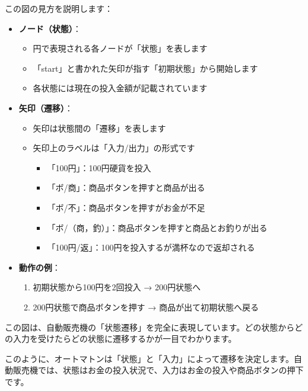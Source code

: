 この図の見方を説明します：

\begin{itemize}
\tightlist
\item
  \textbf{ノード（状態）}：

  \begin{itemize}
  \tightlist
  \item
    円で表現される各ノードが「状態」を表します
  \item
    「start」と書かれた矢印が指す「初期状態」から開始します
  \item
    各状態には現在の投入金額が記載されています
  \end{itemize}
\item
  \textbf{矢印（遷移）}：

  \begin{itemize}
  \tightlist
  \item
    矢印は状態間の「遷移」を表します
  \item
    矢印上のラベルは「入力/出力」の形式です

    \begin{itemize}
    \tightlist
    \item
      「100円」：100円硬貨を投入
    \item
      「ボ/商」：商品ボタンを押すと商品が出る
    \item
      「ボ/不」：商品ボタンを押すがお金が不足
    \item
      「ボ/（商，釣）」：商品ボタンを押すと商品とお釣りが出る
    \item
      「100円/返」：100円を投入するが満杯なので返却される
    \end{itemize}
  \end{itemize}
\item
  \textbf{動作の例}：

  \begin{enumerate}
  \def\labelenumi{\arabic{enumi}.}
  \tightlist
  \item
    初期状態から100円を2回投入 → 200円状態へ
  \item
    200円状態で商品ボタンを押す → 商品が出て初期状態へ戻る
  \end{enumerate}
\end{itemize}

この図は、自動販売機の「状態遷移」を完全に表現しています。どの状態からどの入力を受けたらどの状態に遷移するかが一目でわかります。

このように、オートマトンは「状態」と「入力」によって遷移を決定します。自動販売機では、状態はお金の投入状況で、入力はお金の投入や商品ボタンの押下です。

